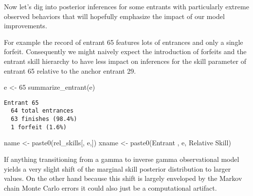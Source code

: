 \documentclass[
  letterpaper,
  DIV=11,
  numbers=noendperiod]{scrartcl}
\newenvironment{Shaded}{\begin{snugshade}}{\end{snugshade}}
\newcommand{\DecValTok}[1]{\textcolor[rgb]{0.68,0.00,0.00}{#1}}
\newcommand{\FunctionTok}[1]{\textcolor[rgb]{0.28,0.35,0.67}{#1}}
\newcommand{\NormalTok}[1]{\textcolor[rgb]{0.00,0.23,0.31}{#1}}
\newcommand{\OtherTok}[1]{\textcolor[rgb]{0.00,0.23,0.31}{#1}}
\newcommand{\StringTok}[1]{\textcolor[rgb]{0.13,0.47,0.30}{#1}}
\begin{document}
Now let's dig into posterior inferences for some entrants with
particularly extreme observed behaviors that will hopefully emphasize
the impact of our model improvements.

For example the record of entrant 65 features lots of entrances and only
a single forfeit. Consequently we might naively expect the introduction
of forfeits and the entrant skill hierarchy to have less impact on
inferences for the skill parameter of entrant 65 relative to the anchor
entrant 29.

\begin{Shaded}
\begin{Highlighting}[]
\NormalTok{e }\OtherTok{\textless{}{-}} \DecValTok{65}
\FunctionTok{summarize\_entrant}\NormalTok{(e)}
\end{Highlighting}
\end{Shaded}

\begin{verbatim}
Entrant 65
  64 total entrances
  63 finishes (98.4%)
  1 forfeit (1.6%)
\end{verbatim}

\begin{Shaded}
\begin{Highlighting}[]
\NormalTok{name }\OtherTok{\textless{}{-}} \FunctionTok{paste0}\NormalTok{(}\StringTok{\textquotesingle{}rel\_skills[\textquotesingle{}}\NormalTok{, e,}\StringTok{\textquotesingle{}]\textquotesingle{}}\NormalTok{)}
\NormalTok{xname }\OtherTok{\textless{}{-}} \FunctionTok{paste0}\NormalTok{(}\StringTok{\textquotesingle{}Entrant \textquotesingle{}}\NormalTok{, e, }\StringTok{\textquotesingle{} Relative Skill\textquotesingle{}}\NormalTok{)}
\end{Highlighting}
\end{Shaded}

If anything transitioning from a gamma to inverse gamma observational
model yields a very slight shift of the marginal skill posterior
distribution to larger values. On the other hand because this shift is
largely enveloped by the Markov chain Monte Carlo errors it could also
just be a computational artifact.
\end{document}
